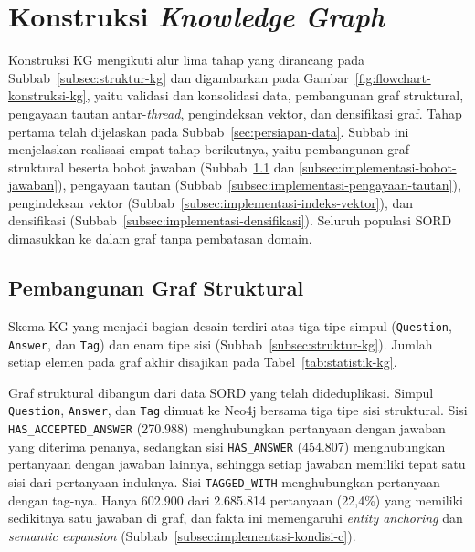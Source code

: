 \section{Konstruksi \emph{Knowledge Graph}}
\label{sec:implementasi-kg}

Konstruksi KG mengikuti alur lima tahap yang dirancang pada Subbab~\ref{subsec:struktur-kg} dan digambarkan pada Gambar~\ref{fig:flowchart-konstruksi-kg}, yaitu validasi dan konsolidasi data, pembangunan graf struktural, pengayaan tautan antar-\emph{thread}, pengindeksan vektor, dan densifikasi graf. Tahap pertama telah dijelaskan pada Subbab~\ref{sec:persiapan-data}. Subbab ini menjelaskan realisasi empat tahap berikutnya, yaitu pembangunan graf struktural beserta bobot jawaban (Subbab~\ref{subsec:pembangunan-graf-struktural} dan \ref{subsec:implementasi-bobot-jawaban}), pengayaan tautan (Subbab~\ref{subsec:implementasi-pengayaan-tautan}), pengindeksan vektor (Subbab~\ref{subsec:implementasi-indeks-vektor}), dan densifikasi (Subbab~\ref{subsec:implementasi-densifikasi}). Seluruh populasi SORD dimasukkan ke dalam graf tanpa pembatasan domain.

\subsection{Pembangunan Graf Struktural}
\label{subsec:pembangunan-graf-struktural}

Skema KG yang menjadi bagian desain terdiri atas tiga tipe simpul (\texttt{Question}, \texttt{Answer}, dan \texttt{Tag}) dan enam tipe sisi (Subbab~\ref{subsec:struktur-kg}). Jumlah setiap elemen pada graf akhir disajikan pada Tabel~\ref{tab:statistik-kg}.

Graf struktural dibangun dari data SORD yang telah dideduplikasi. Simpul \texttt{Question}, \texttt{Answer}, dan \texttt{Tag} dimuat ke Neo4j bersama tiga tipe sisi struktural. Sisi \texttt{HAS\_ACCEPTED\_ANSWER} (270.988) menghubungkan pertanyaan dengan jawaban yang diterima penanya, sedangkan sisi \texttt{HAS\_ANSWER} (454.807) menghubungkan pertanyaan dengan jawaban lainnya, sehingga setiap jawaban memiliki tepat satu sisi dari pertanyaan induknya. Sisi \texttt{TAGGED\_WITH} menghubungkan pertanyaan dengan tag-nya. Hanya 602.900 dari 2.685.814 pertanyaan (22,4\%) yang memiliki sedikitnya satu jawaban di graf, dan fakta ini memengaruhi \emph{entity anchoring} dan \emph{semantic expansion} (Subbab~\ref{subsec:implementasi-kondisi-c}).

